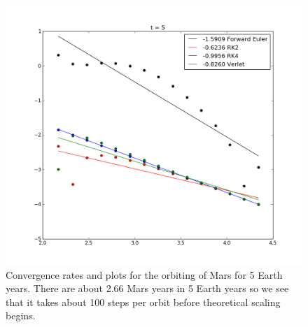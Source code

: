 \documentclass{article}
\begin{document}
\begin{figure}[h]
    \includegraphics[width=\textwidth]{marsconv.png}
    \caption{Convergence rates and plots for the orbiting of Mars for 5 Earth years. There are about 2.66 Mars years in 5 Earth years so we see that it takes about 100 steps per orbit before theoretical scaling begins.}
    \label{fig:marsconv}
\end{figure}
\end{document}
